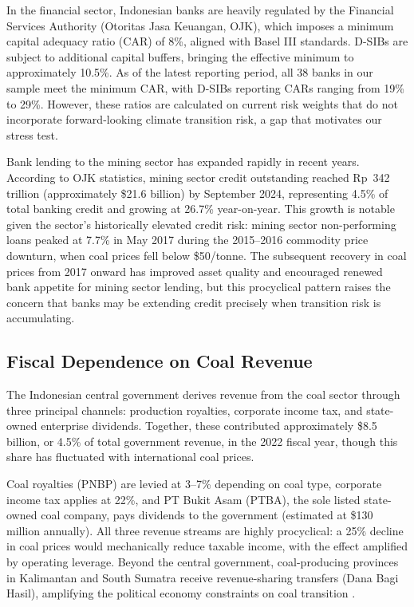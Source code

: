 In the financial sector, Indonesian banks are heavily regulated by the Financial Services Authority (Otoritas Jasa Keuangan, OJK), which imposes a minimum capital adequacy ratio (CAR) of 8\%, aligned with Basel III standards. D-SIBs are subject to additional capital buffers, bringing the effective minimum to approximately 10.5\%. As of the latest reporting period, all 38 banks in our sample meet the minimum CAR, with D-SIBs reporting CARs ranging from 19\% to 29\%. However, these ratios are calculated on current risk weights that do not incorporate forward-looking climate transition risk, a gap that motivates our stress test.

Bank lending to the mining sector has expanded rapidly in recent years. According to OJK statistics, mining sector credit outstanding reached Rp~342 trillion (approximately \$21.6 billion) by September 2024, representing 4.5\% of total banking credit and growing at 26.7\% year-on-year. This growth is notable given the sector's historically elevated credit risk: mining sector non-performing loans peaked at 7.7\% in May 2017 during the 2015--2016 commodity price downturn, when coal prices fell below \$50/tonne. The subsequent recovery in coal prices from 2017 onward has improved asset quality and encouraged renewed bank appetite for mining sector lending, but this procyclical pattern raises the concern that banks may be extending credit precisely when transition risk is accumulating.


\subsection{Fiscal Dependence on Coal Revenue}
\label{subsec:fiscal_dependence}

The Indonesian central government derives revenue from the coal sector through three principal channels: production royalties, corporate income tax, and state-owned enterprise dividends. Together, these contributed approximately \$8.5 billion, or 4.5\% of total government revenue, in the 2022 fiscal year, though this share has fluctuated with international coal prices.


Coal royalties (PNBP) are levied at 3--7\% depending on coal type, corporate income tax applies at 22\%, and PT Bukit Asam (PTBA), the sole listed state-owned coal company, pays dividends to the government (estimated at \$130 million annually). All three revenue streams are highly procyclical: a 25\% decline in coal prices would mechanically reduce taxable income, with the effect amplified by operating leverage. Beyond the central government, coal-producing provinces in Kalimantan and South Sumatra receive revenue-sharing transfers (Dana Bagi Hasil), amplifying the political economy constraints on coal transition \citep{Heffron2018, JakobSteckel2016}.

